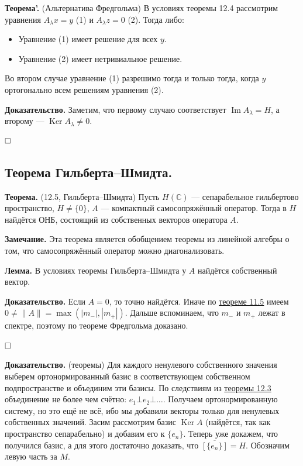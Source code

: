 \documentclass[12pt, a4paper]{article}
\DeclareMathOperator{\im}{Im}
\DeclareMathOperator{\Ker}{Ker}
\newcommand{\QED}{$\hfill\square$}
\begin{document}
\textbf{Теорема'.} (Альтернатива Фредгольма) В условиях теоремы 12.4 рассмотрим уравнения $A_\lambda x = y$ (1) и $A_\lambda z = 0$ (2).
Тогда либо:
\begin{itemize}
    \item Уравнение (1) имеет решение для всех $y$.
    \item Уравнение (2) имеет нетривиальное решение.
\end{itemize}
Во втором случае уравнение (1) разрешимо тогда и только тогда, когда $y$ ортогонально всем решениям уравнения (2).

\textbf{Доказательство.}
Заметим, что первому случаю соответствует $\im A_\lambda = H$, а второму --- $\Ker A_\lambda \ne 0$.

\QED



\subsection{Теорема Гильберта--Шмидта.}

 \label{th:12-5} \textbf{Теорема.} (12.5, Гильберта--Шмидта) Пусть $H(\mathbb C)$ --- сепарабельное гильбертово пространство, $H \neq \{0\}$, $A$ --- компактный самосопряжённый оператор.
Тогда в $H$ найдётся ОНБ, состоящий из собственных векторов оператора $A$.

\textbf{Замечание.} Эта теорема является обобщением теоремы из линейной алгебры о том, что самосопряжённый оператор можно диагонализовать.

\textbf{Лемма.} В условиях теоремы Гильберта--Шмидта у $A$ найдётся собственный вектор.

\textbf{Доказательство.} Если $A = 0$, то точно найдётся. Иначе по \hyperref[th:11-5]{теореме 11.5} имеем $0 \ne \|A\| = \max(|m_-|, |m_+|)$.
Дальше вспоминаем, что $m_-$ и $m_+$ лежат в спектре, поэтому по теореме Фредгольма доказано.

\QED

\textbf{Доказательство.} (теоремы) Для каждого ненулевого собственного значения выберем ортонормированный базис в соответствующем собственном подпространстве и объединим эти базисы. По следствиям из \hyperref[th:12-3]{теоремы 12.3} объединение не более чем счётно: $e_1 \bot e_2 \bot \dots$.
Получаем ортонормированную систему, но это ещё не всё, ибо мы добавили векторы только для ненулевых собственных значений.
Засим рассмотрим базис $\Ker A$ (найдётся, так как пространство сепарабельно) и добавим его к $\{e_n\}$.
Теперь уже докажем, что получился базис, а для этого достаточно доказать, что $\overline {[\{e_n\}]} = H$. Обозначим левую часть за $M$.
\end{document}
